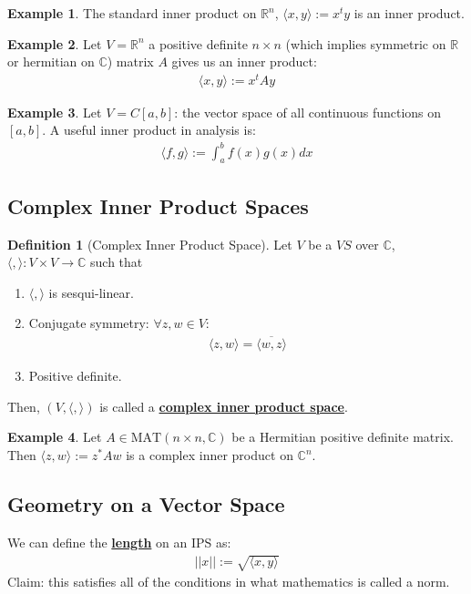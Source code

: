 \documentclass[11pt]{scrartcl}
\newcommand{\R}[0]{\mathbb{R}}
\theoremstyle{definition}
\newtheorem{definition}{Definition}
\newtheorem{ex}{Example}
\theoremstyle{remark}
\newcommand{\dfn}[1]{\textbf{\underline{#1}}}
\newcommand{\C}[0]{\mathbb{C}}
\newcommand{\matn}[1]{\text{MAT}(n\times n, \mathbb{#1})}
\begin{document}
\begin{ex}
	The standard inner product on $\R^n$, $\langle x, y \rangle := x^t y$ is an inner product. 
\end{ex}

\begin{ex}
	Let $V = \R^n$ a positive definite $n \times n$ (which implies symmetric on $\R$ or hermitian on $\C$) matrix $A$ gives us an inner product: 
	\begin{align}
		\langle x, y \rangle := x^t Ay 	
	\end{align}
\end{ex}

\begin{ex} 
Let $V = C[a,b]$: the vector space of all continuous functions on $[a,b]$. A useful inner product in analysis is: 
\begin{align}
	\langle f, g \rangle := \int_a^b f(x) g(x) dx 	
\end{align}
	
\end{ex}

\subsection{Complex Inner Product Spaces}
\begin{definition}[Complex Inner Product Space]
	Let $V$ be a $VS$ over $\C$, $\langle, \rangle : V \times V \rightarrow \C$ such that
	\begin{enumerate}[noitemsep]
		\item $\langle, \rangle$ is sesqui-linear.
		\item Conjugate symmetry: $\forall z , w \in V$: 
		\begin{align}
			\langle z, w \rangle = \overline{\langle w, z \rangle} 	
		\end{align}
	\item Positive definite. 
	\end{enumerate}
	Then, $(V, \langle, \rangle)$ is called a \dfn{complex inner product space}. 
\end{definition}

\begin{ex}
	Let $A \in \matn{C}$ be a Hermitian positive definite matrix. Then $\langle z, w \rangle := z^* A w$ is a complex inner product on $\C^n$. 
\end{ex}

\subsection{Geometry on a Vector Space}
We can define the \dfn{length} on an IPS as: 
\begin{align}
	|| x || := \sqrt{ \langle x, y \rangle } 	
\end{align}
Claim: this satisfies all of the conditions in what mathematics is called a norm. 
\end{document}
